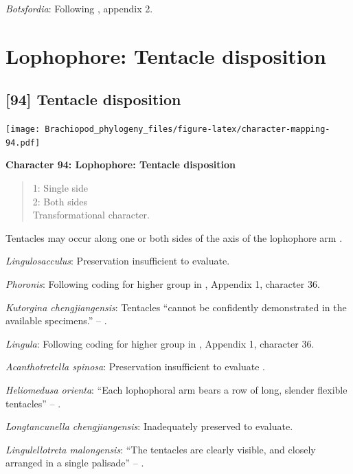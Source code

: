 \documentclass[]{book}
\theoremstyle{definition}
\theoremstyle{definition}
\theoremstyle{definition}
\theoremstyle{remark}
\begin{document}
\emph{Botsfordia}: Following \citet{Williams1998Thediversity}, appendix
2.

\hypertarget{lophophore-tentacle-disposition}{%
\section{Lophophore: Tentacle
disposition}\label{lophophore-tentacle-disposition}}

\hypertarget{tentacle-disposition}{%
\subsection*{{[}94{]} Tentacle disposition}\label{tentacle-disposition}}

\texttt{[image: Brachiopod\_phylogeny\_files/figure-latex/character-mapping-94.pdf]}

\textbf{Character 94: Lophophore: Tentacle disposition}

\begin{quote}
1: Single side\\
2: Both sides\\
Transformational character.
\end{quote}

Tentacles may occur along one or both sides of the axis of the
lophophore arm \citep{Carlson1995Phylogeneticrelationships}.

\emph{Lingulosacculus}: Preservation insufficient to evaluate.

\emph{Phoronis}: Following coding for higher group in
\citet{Carlson1995Phylogeneticrelationships}, Appendix 1, character 36.

\emph{Kutorgina chengjiangensis}: Tentacles ``cannot be confidently
demonstrated in the available specimens.'' --
\citet{Zhang2007Rhynchonelliformeanbrachiopods}.

\emph{Lingula}: Following coding for higher group in
\citet{Carlson1995Phylogeneticrelationships}, Appendix 1, character 36.

\emph{Acanthotretella spinosa}: Preservation insufficient to evaluate
\citep{Holmer2006Aspinose}.

\emph{Heliomedusa orienta}: ``Each lophophoral arm bears a row of long,
slender flexible tentacles'' -- \citet{Zhang2009Architectureand}.

\emph{Longtancunella chengjiangensis}: Inadequately preserved to
evaluate.

\emph{Lingulellotreta malongensis}: ``The tentacles are clearly visible,
and closely arranged in a single palisade'' -- \citet{Zhang2004Newdata}.
\end{document}
